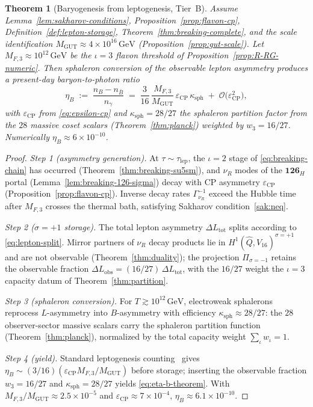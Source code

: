\documentclass[aps,prd,onecolumn,amsmath,amssymb,nofootinbib,11pt]{revtex4-2}
\numberwithin{equation}{section}
\theoremstyle{plain}
\newtheorem{theorem}{Theorem}[section]
\theoremstyle{definition}
\theoremstyle{remark}
\begin{document}
\begin{theorem}[Baryogenesis from leptogenesis, Tier~B]\label{thm:baryogenesis}
Assume Lemma~\ref{lem:sakharov-conditions}, Proposition~\ref{prop:flavon-cp},
Definition~\ref{def:lepton-storage}, Theorem~\ref{thm:breaking-complete},
and the scale identification $M_{\mathrm{GUT}}\approx 4\times 10^{16}\,\mathrm{GeV}$
(Proposition~\ref{prop:gut-scale}). Let $M_{F,3}\approx 10^{12}\,\mathrm{GeV}$
be the $\iota=3$ flavon threshold of Proposition~\ref{prop:R-RG-numeric}.
Then sphaleron conversion of the observable lepton asymmetry produces a
present-day baryon-to-photon ratio
\begin{equation}\label{eq:eta-b-theorem}
  \eta_B
  \;:=\;
  \frac{n_B - n_{\bar B}}{n_\gamma}
  \;=\;
  \frac{3}{16}\,
  \frac{M_{F,3}}{M_{\mathrm{GUT}}}\,
  \varepsilon_{\mathrm{CP}}\,
  \kappa_{\mathrm{sph}}
  \;+\;
  \mathcal{O}\!\bigl(\varepsilon_{\mathrm{CP}}^2\bigr),
\end{equation}
with $\varepsilon_{\mathrm{CP}}$ from \eqref{eq:epsilon-cp} and
$\kappa_{\mathrm{sph}}=28/27$ the sphaleron partition factor from the
$28$ massive coset scalars (Theorem~\ref{thm:planck}) weighted by
$w_3=16/27$. Numerically $\eta_B\approx 6\times 10^{-10}$.
\end{theorem}

\begin{proof}
\emph{Step 1 (asymmetry generation).}
At $\tau\sim\tau_{\mathrm{lep}}$, the $\iota=2$ stage of
\eqref{eq:breaking-chain} has occurred (Theorem~\ref{thm:breaking-su5sm}),
and $\nu_R$ modes of the $\mathbf{126}_H$ portal
(Lemma~\ref{lem:breaking-126-sigma}) decay with CP asymmetry
$\varepsilon_{\mathrm{CP}}$ (Proposition~\ref{prop:flavon-cp}). Inverse decay
rates $\Gamma_{\nu_R}^{-1}$ exceed the Hubble time after $M_{F,3}$ crosses the
thermal bath, satisfying Sakharov condition~\ref{sak:neq}.

\emph{Step 2 ($\sigma=+1$ storage).}
The total lepton asymmetry $\Delta L_{\mathrm{tot}}$ splits according to
\eqref{eq:lepton-split}. Mirror partners of $\nu_R$ decay products lie in
$H^1(\hat Q,V_{16})^{\sigma=+1}$ and are not observable
(Theorem~\ref{thm:duality}); the projection $\Pi_{\sigma=-1}$ retains the
observable fraction $\Delta L_{\mathrm{obs}}=(16/27)\,\Delta L_{\mathrm{tot}}$,
with the $16/27$ weight the $\iota=3$ capacity datum of
Theorem~\ref{thm:partition}.

\emph{Step 3 (sphaleron conversion).}
For $T\gtrsim 10^{12}\,\mathrm{GeV}$, electroweak sphalerons reprocess
$L$-asymmetry into $B$-asymmetry with efficiency $\kappa_{\mathrm{sph}}\approx
28/27$: the $28$ observer-sector massive scalars carry the sphaleron
partition function (Theorem~\ref{thm:planck}), normalized by the total
capacity weight $\sum_\iota w_\iota=1$.

\emph{Step 4 (yield).}
Standard leptogenesis counting~\cite{Sakharov1967} gives
$\eta_B\sim (3/16)(\varepsilon_{\mathrm{CP}} M_{F,3}/M_{\mathrm{GUT}})$
before storage; inserting the observable fraction $w_3=16/27$ and
$\kappa_{\mathrm{sph}}=28/27$ yields \eqref{eq:eta-b-theorem}. With
$M_{F,3}/M_{\mathrm{GUT}}\approx 2.5\times 10^{-5}$ and
$\varepsilon_{\mathrm{CP}}\approx 7\times 10^{-4}$,
$\eta_B\approx 6.1\times 10^{-10}$.
\end{proof}
\end{document}
